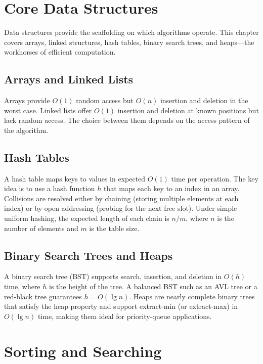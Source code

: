 \documentclass[
    language=english,
    doctype=book,
    institution=none,
    titlestyle=book
]{../../omnilatex}
\begin{document}
\chapter{Core Data Structures}\label{ch:datastructures}

Data structures provide the scaffolding on which algorithms operate. This chapter covers arrays, linked structures, hash tables, binary search trees, and heaps---the workhorses of efficient computation.

\section{Arrays and Linked Lists}

Arrays provide $O(1)$ random access but $O(n)$ insertion and deletion in the worst case. Linked lists offer $O(1)$ insertion and deletion at known positions but lack random access. The choice between them depends on the access pattern of the algorithm.

\section{Hash Tables}

A hash table maps keys to values in expected $O(1)$ time per operation. The key idea is to use a hash function $h$ that maps each key to an index in an array. Collisions are resolved either by chaining (storing multiple elements at each index) or by open addressing (probing for the next free slot). Under simple uniform hashing, the expected length of each chain is $n/m$, where $n$ is the number of elements and $m$ is the table size.

\section{Binary Search Trees and Heaps}

A binary search tree (BST) supports search, insertion, and deletion in $O(h)$ time, where $h$ is the height of the tree. A balanced BST such as an AVL tree or a red-black tree guarantees $h = O(\lg n)$. Heaps are nearly complete binary trees that satisfy the heap property and support extract-min (or extract-max) in $O(\lg n)$ time, making them ideal for priority-queue applications.

\chapter{Sorting and Searching}\label{ch:sorting}
\end{document}
